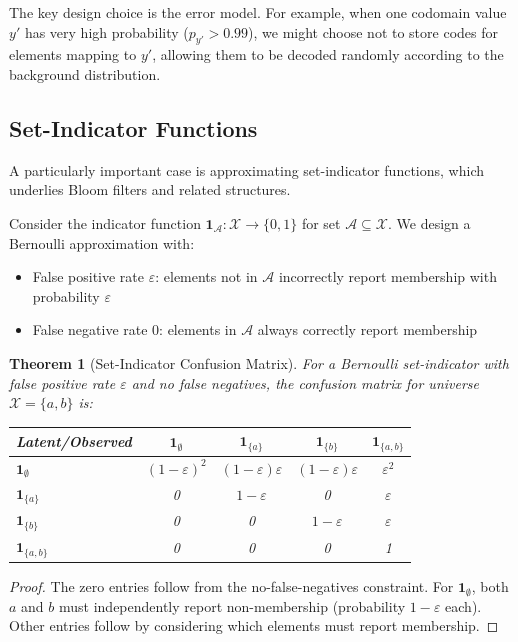 \documentclass[11pt]{article}
\newtheorem{theorem}{Theorem}
\newcommand{\calX}{\mathcal{X}}
\newcommand{\calA}{\mathcal{A}}
\newcommand{\eps}{\varepsilon}
\newcommand{\indicator}[1]{\mathbf{1}_{#1}}
\begin{document}
The key design choice is the error model. For example, when one codomain value $y'$ has very high probability ($p_{y'} > 0.99$), we might choose not to store codes for elements mapping to $y'$, allowing them to be decoded randomly according to the background distribution.

\subsection{Set-Indicator Functions}

A particularly important case is approximating set-indicator functions, which underlies Bloom filters and related structures.

Consider the indicator function $\indicator{\calA}: \calX \to \{0,1\}$ for set $\calA \subseteq \calX$. We design a Bernoulli approximation with:
\begin{itemize}
\item False positive rate $\eps$: elements not in $\calA$ incorrectly report membership with probability $\eps$
\item False negative rate 0: elements in $\calA$ always correctly report membership
\end{itemize}

\begin{theorem}[Set-Indicator Confusion Matrix]
For a Bernoulli set-indicator with false positive rate $\eps$ and no false negatives, the confusion matrix for universe $\calX = \{a,b\}$ is:

\begin{center}
\begin{tabular}{l|cccc}
\toprule
Latent/Observed & $\indicator{\emptyset}$ & $\indicator{\{a\}}$ & $\indicator{\{b\}}$ & $\indicator{\{a,b\}}$ \\
\midrule
$\indicator{\emptyset}$ & $(1-\eps)^2$ & $(1-\eps)\eps$ & $(1-\eps)\eps$ & $\eps^2$ \\
$\indicator{\{a\}}$ & 0 & $1-\eps$ & 0 & $\eps$ \\
$\indicator{\{b\}}$ & 0 & 0 & $1-\eps$ & $\eps$ \\
$\indicator{\{a,b\}}$ & 0 & 0 & 0 & 1 \\
\bottomrule
\end{tabular}
\end{center}
\end{theorem}

\begin{proof}
The zero entries follow from the no-false-negatives constraint. For $\indicator{\emptyset}$, both $a$ and $b$ must independently report non-membership (probability $1-\eps$ each). Other entries follow by considering which elements must report membership.
\end{proof}
\end{document}
